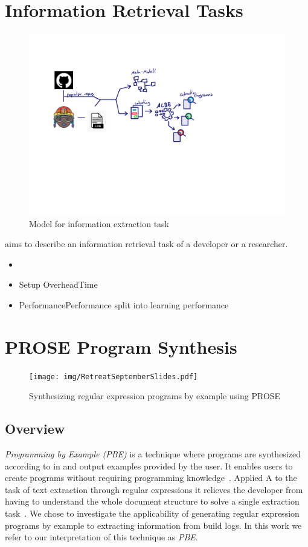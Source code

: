 \documentclass[\myrootdir/main.tex]{subfiles}
\begin{document}
\section{Information Retrieval Tasks}
\begin{figure}[h]
	\centering
	\includegraphics[page=4, width=\textwidth, trim={0.5cm 0.5cm 0.5cm 0.5cm}, clip]{img/flow-of-research.pdf}
	\caption{Model for information extraction task}
	\label{fig:modelt-ie-task}
\end{figure}
aims to describe an information retrieval task of a developer or a researcher.
\begin{itemize}
	\item {}
	\item{Setup Overhead}{Time}
	\item{Performance}{Performance} split into learning performance
\end{itemize}


\section{PROSE Program Synthesis}
\begin{figure}[h]
  \centering
\texttt{[image: img/RetreatSeptemberSlides.pdf]}
  \caption{Synthesizing regular expression programs by example using PROSE}
  \label{fig:prose-explanation}
\end{figure}
\subsection*{Overview}
\emph{Programming by Example (PBE)} is a technique where programs are synthesized according to in and output examples provided by the user. It enables users to create programs without requiring programming knowledge~\cite{mayer2015user}. Applied A to the task of text extraction through regular expressions it relieves the developer from having to understand the whole document structure to solve a single extraction task~\cite{le2014flashextract:}.
We chose to investigate the applicability of generating regular expression programs by example to extracting information from build logs. In this work we refer to our interpretation of this technique as \emph{PBE}. 
\end{document}
